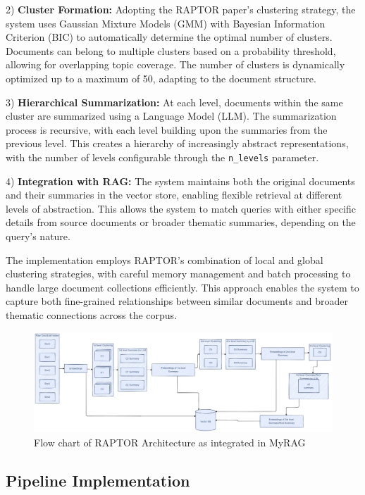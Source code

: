 \documentclass{scrartcl}
\begin{document}
2) \textbf{Cluster Formation:} Adopting the RAPTOR paper's clustering strategy, the system uses Gaussian Mixture Models (GMM) with Bayesian Information Criterion (BIC) to automatically determine the optimal number of clusters. Documents can belong to multiple clusters based on a probability threshold, allowing for overlapping topic coverage. The number of clusters is dynamically optimized up to a maximum of 50, adapting to the document structure.

3) \textbf{Hierarchical Summarization:} At each level, documents within the same cluster are summarized using a Language Model (LLM). The summarization process is recursive, with each level building upon the summaries from the previous level. This creates a hierarchy of increasingly abstract representations, with the number of levels configurable through the \texttt{n\_levels} parameter.

4) \textbf{Integration with RAG:} The system maintains both the original documents and their summaries in the vector store, enabling flexible retrieval at different levels of abstraction. This allows the system to match queries with either specific details from source documents or broader thematic summaries, depending on the query's nature.

The implementation employs RAPTOR's combination of local and global clustering strategies, with careful memory management and batch processing to handle large document collections efficiently. This approach enables the system to capture both fine-grained relationships between similar documents and broader thematic connections across the corpus.

\begin{figure}[H]
	\centering
	\includegraphics[width=\linewidth]{Raptor.pdf}
	\caption{Flow chart of RAPTOR Architecture as integrated in MyRAG}
	\label{fig:raptor}
\end{figure}

\subsection{Pipeline Implementation}
\end{document}
